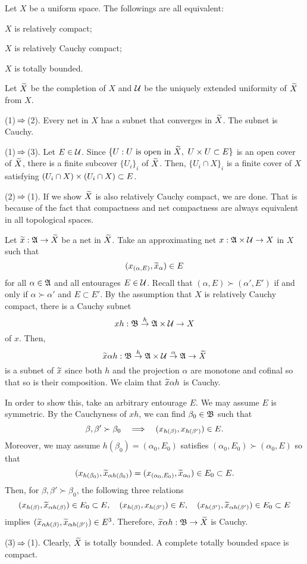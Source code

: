 \documentclass{../exp}
\begin{document}
\begin{thm}
Let $X$ be a uniform space.
The followings are all equivalent:
\begin{cond}
\item $X$ is relatively compact;
\item $X$ is relatively Cauchy compact;
\item $X$ is totally bounded.
\end{cond}
\end{thm}
\begin{pf}
Let $\widetilde X$ be the completion of $X$ and $\mathcal{U}$ be the uniquely extended uniformity of $\widetilde X$ from $X$.

(1)$\impl$(2).
Every net in $X$ has a subnet that converges in $\widetilde X$.
The subnet is Cauchy.

(1)$\impl$(3).
Let $E\in\mathcal{U}$.
Since $\{U:U\text{ is open in }\widetilde X,\ U\times U\subset E\}$ is an open cover of $\widetilde X$, there is a finite subcover $\{U_i\}_i$ of $\widetilde X$.
Then, $\{U_i\cap X\}_i$ is a finite cover of $X$ satisfying $(U_i\cap X)\times(U_i\cap X)\subset E$.

(2)$\impl$(1).
If we show $\widetilde X$ is also relatively Cauchy compact, we are done.
That is because of the fact that compactness and net compactness are always equivalent in all topological spaces.

Let $\tld x:\fA\to\tld X$ be a net in $\widetilde X$.
Take an approximating net $x:\fA\x\cU\to X$ in $X$ such that
\[(x_{(\alpha,E)},\widetilde x_\alpha)\in E\]
for all $\alpha\in\mathfrak{A}$ and all entourages $E\in\mathcal{U}$.
Recall that $(\alpha,E)\succ(\alpha',E')$ if and only if $\alpha\succ\alpha'$ and $E\subset E'$.
By the assumption that $X$ is relatively Cauchy compact, there is a Cauchy subnet
\[xh:\fB\to{h}\fA\x\cU\to X\]
of $x$.
Then,
\[\tld x\alpha h:\fB\to{h}\fA\x\cU\to{\alpha}\fA\to\tld X\]
is a subnet of $\widetilde x$ since both $h$ and the projection $\alpha$ are monotone and cofinal so that so is their composition.
We claim that $\widetilde x\alpha h$ is Cauchy.

In order to show this, take an arbitrary entourage $E$.
We may assume $E$ is symmetric.
By the Cauchyness of $xh$, we can find $\beta_0\in\mathfrak{B}$ such that
\[\beta,\beta'\succ\beta_0\impl(x_{h(\beta)},x_{h(\beta')})\in E.\]
Moreover, we may assume $h(\beta_0)=(\alpha_0,E_0)$ satisfies $(\alpha_0,E_0)\succ(\alpha_0,E)$ so that
\[(x_{h(\beta_0)},\widetilde x_{\alpha h(\beta_0)})=(x_{(\alpha_0,E_0)},\widetilde x_{\alpha_0})\in E_0\subset E.\]
Then, for $\beta,\beta'\succ\beta_0$, the following three relations
\[(x_{h(\beta)},\widetilde x_{\alpha h(\beta)})\in E_0\subset E,\quad(x_{h(\beta)},x_{h(\beta')})\in E,\quad(x_{h(\beta')},\widetilde x_{\alpha h(\beta')})\in E_0\subset E\]
implies $(\widetilde x_{\alpha h(\beta)},\widetilde x_{\alpha h(\beta')})\in E^3$.
Therefore, $\tld x\alpha h:\fB\to\tld X$ is Cauchy.

(3)$\impl$(1).
Clearly, $\widetilde X$ is totally bounded.
A complete totally bounded space is compact.
\end{pf}
\end{document}
